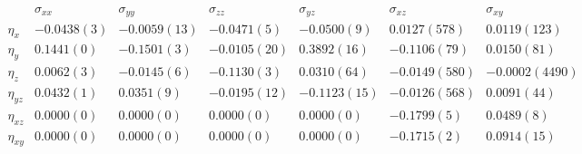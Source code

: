 \documentclass[a4paper,10pt]{article}
\begin{document}
$
\begin{matrix}
            & \sigma_{xx} & \sigma_{yy} & \sigma_{zz} & \sigma_{yz} & \sigma_{xz} & \sigma_{xy} \\ 
\eta_{x}    &   -0.0438(  3) & -0.0059( 13) & -0.0471(  5) & -0.0500(  9) &  0.0127(578) &  0.0119(123) \\
\eta_{y}    &    0.1441(  0) & -0.1501(  3) & -0.0105( 20) &  0.3892( 16) & -0.1106( 79) &  0.0150( 81) \\
\eta_{z}    &    0.0062(  3) & -0.0145(  6) & -0.1130(  3) &  0.0310( 64) & -0.0149(580) & -0.0002(4490) \\
\eta_{yz}   &    0.0432(  1) &  0.0351(  9) & -0.0195( 12) & -0.1123( 15) & -0.0126(568) &  0.0091( 44) \\
\eta_{xz}   &    0.0000(  0) &  0.0000(  0) &  0.0000(  0) &  0.0000(  0) & -0.1799(  5) &  0.0489(  8) \\
\eta_{xy}   &  0.0000(  0) &  0.0000(  0) &  0.0000(  0) &  0.0000(  0) & -0.1715(  2) &  0.0914( 15) \\
\end{matrix}
$
\end{document}
